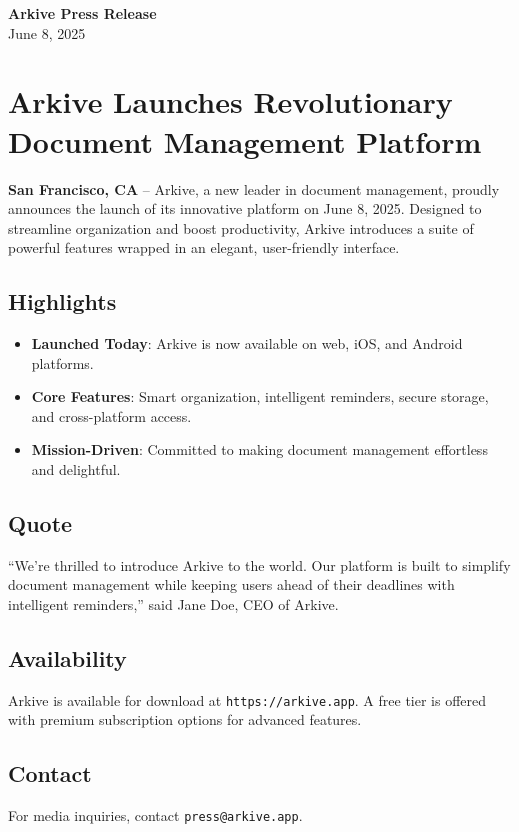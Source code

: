 \documentclass[11pt, a4paper]{article}
\begin{document}
\begin{center}
    {\LARGE\bfseries Arkive Press Release}\\[0.5cm]
    {\large June 8, 2025}
\end{center}

\section{Arkive Launches Revolutionary Document Management Platform}
\textbf{San Francisco, CA} – Arkive, a new leader in document management, proudly announces the launch of its innovative platform on June 8, 2025. Designed to streamline organization and boost productivity, Arkive introduces a suite of powerful features wrapped in an elegant, user-friendly interface.

\subsection{Highlights}
\begin{itemize}
    \item \textbf{Launched Today}: Arkive is now available on web, iOS, and Android platforms.
    \item \textbf{Core Features}: Smart organization, intelligent reminders, secure storage, and cross-platform access.
    \item \textbf{Mission-Driven}: Committed to making document management effortless and delightful.
\end{itemize}

\subsection{Quote}
``We’re thrilled to introduce Arkive to the world. Our platform is built to simplify document management while keeping users ahead of their deadlines with intelligent reminders,'' said Jane Doe, CEO of Arkive.

\subsection{Availability}
Arkive is available for download at \texttt{https://arkive.app}. A free tier is offered with premium subscription options for advanced features.

\subsection{Contact}
For media inquiries, contact \texttt{press@arkive.app}.
\end{document}
